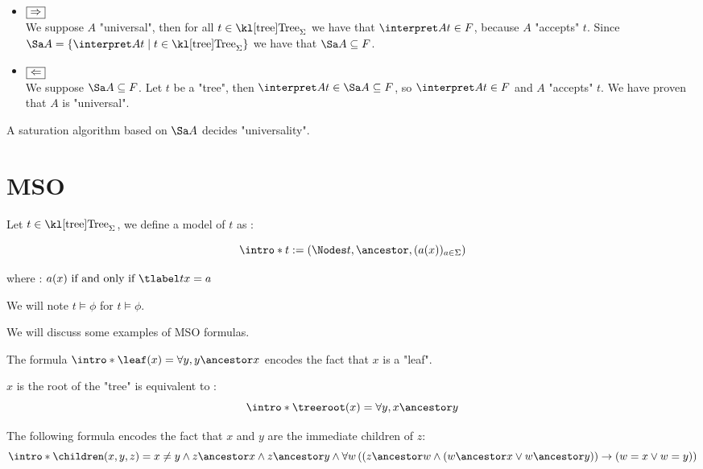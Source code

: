 \documentclass{article}
\begin{document}
\begin{proofI}
	\begin{itemize}
		\item $\fbox{$\Rightarrow$}$\\
		      We suppose $A$ "universal", then for all $t \in \tree_\Sigma$ we have that $\interpret A t \in F$, because $A$ "accepts" $t$.
		      Since $\Sa A = \setdef {\interpret A t} {t\in \tree_\Sigma}$ we have that $\Sa A \subseteq F$.

		\item $\fbox{$\Leftarrow$}$\\
		      We suppose $\Sa A \subseteq F$. Let $t$ be a "tree", then $\interpret A t \in \Sa A \subseteq F$, so $\interpret A t \in F$ and $A$
		      "accepts" $t$. We have proven that $A$ is "universal".
	\end{itemize}
\end{proofI}


\begin{coro}\label{coro:univeral-Sa}
	A saturation algorithm based on $\Sa A$ decides "universality".
\end{coro}


\section{MSO}

\begin{definition}
	Let $t \in \tree_{\Sigma}$, we define a model of $t$ as :

	\[\intro* t := (\Nodes t, \ancestor , (a (x))_{a \in \Sigma}) \]

	where : $a(x) \tiff \tlabel t x = a$

    We will note $t \models \phi$ for $t \models \phi$. 
\end{definition}


We will discuss some examples of MSO formulas.

\begin{example}
	The formula $\intro* \leaf (x) = \forall y,  y \ancestor x$ encodes the fact that $x$ is a "leaf".
\end{example}

\begin{example}
	$x$ is the root of the "tree" is equivalent to :
	\[\intro* \treeroot (x) = \forall y,  x \ancestor y \]
\end{example}

\begin{example}
	The following formula encodes the fact that $x$ and $y$ are the immediate children of $z$:
	\[\intro* \children (x,y,z) =
		x \neq y \land
		z  \ancestor  x \land  z \ancestor y \land
		\forall w
		\left( \left(
			z \ancestor w \land
				(w \ancestor x \lor w \ancestor  y) \right) \rightarrow (
			w = x \lor w = y
			)
		\right) \]
\end{example}
\end{document}
